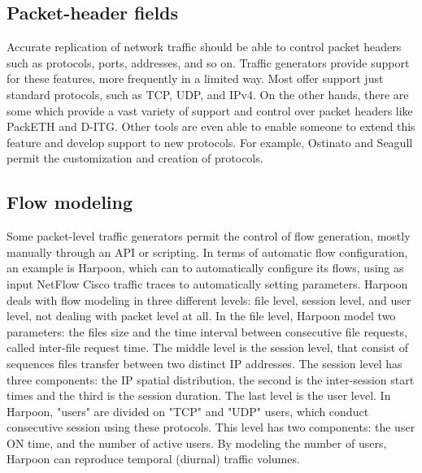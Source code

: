 \subsection{Packet-header fields}

Accurate replication of network traffic should be able to control packet headers such as protocols, ports, addresses, and so on. Traffic generators provide support for these features, more frequently in a limited way. Most offer support just standard protocols, such as TCP, UDP, and \acrshort{IPv4}. On the other hands, there are some which provide a vast variety of support and control over packet headers like PackETH\cite{web-packeth} and D-ITG\cite{web-ditg}. Other tools are even able to enable someone to extend this feature and develop support to new protocols. For example, Ostinato and Seagull permit the customization and creation of protocols\cite{wp-seagull}.


\subsection{Flow modeling}

Some packet-level traffic generators permit the control of flow generation, mostly manually through an API or scripting. In terms of automatic flow configuration, an example is Harpoon\cite{harpoon-paper}, which can to automatically configure its flows, using as input NetFlow Cisco traffic traces to automatically setting parameters. Harpoon deals with flow modeling in three different levels: file level, session level, and user level, not dealing with packet level at all. In the file level, Harpoon model two parameters: the files size and the time interval between consecutive file requests, called inter-file request time. The middle level is the session level, that consist of sequences files transfer between two distinct \acrshort{IP} addresses. The session level has three components: the IP spatial distribution, the second is the inter-session start times and the third is the session duration. The last level is the user level. In Harpoon, "users" are divided on "TCP" and "UDP" users, which conduct consecutive session using these protocols. This level has two components: the user ON time, and the number of active users. By modeling the number of users, Harpoon can reproduce temporal (diurnal) traffic volumes.


